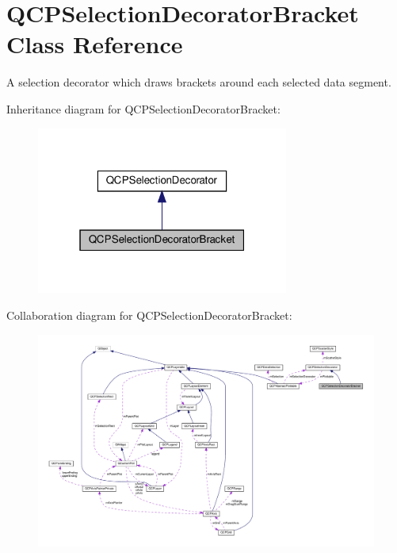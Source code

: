 \hypertarget{classQCPSelectionDecoratorBracket}{}\section{Q\+C\+P\+Selection\+Decorator\+Bracket Class Reference}
\label{classQCPSelectionDecoratorBracket}


A selection decorator which draws brackets around each selected data segment.  




Inheritance diagram for Q\+C\+P\+Selection\+Decorator\+Bracket\+:\nopagebreak
\begin{figure}[H]
\begin{center}
\leavevmode
\includegraphics[width=235pt]{classQCPSelectionDecoratorBracket__inherit__graph}
\end{center}
\end{figure}


Collaboration diagram for Q\+C\+P\+Selection\+Decorator\+Bracket\+:\nopagebreak
\begin{figure}[H]
\begin{center}
\leavevmode
\includegraphics[width=350pt]{classQCPSelectionDecoratorBracket__coll__graph}
\end{center}
\end{figure}
